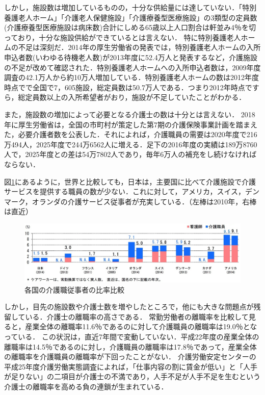 しかし，施設数は増加しているものの，十分な供給量には達していない．「特別養護老人ホーム」「介護老人保健施設」「介護療養型医療施設」の3類型の定員数(介護療養型医療施設は病床数)合計にしめる65歳以上人口割合は軒並み4％を切っており，十分な施設供給ができているとは言えない\cite{lack_facility_1}．
特に特別養護老人ホームの不足は深刻だ．2014年の厚生労働省の発表では，特別養護老人ホームの入所申込者数(いわゆる待機老人数)が2013年度に52.4万人と発表するなど，介護施設の不足が改めて確認された．特別養護老人ホームへの入所申込者数は，2009年度調査の42.1万人から約10万人増加している．特別養護老人ホームの数は2012年度時点でで全国で7，605施設，総定員数は50.7万人である．つまり2012年時点ですら，総定員数以上の入所希望者がおり，施設が不足していたことがわかる\cite{lack_facility_2}．

また，施設数の増加によって必要となる介護士の数は十分とは言えない．
2018年に厚生労働省は，全国の市町村が策定した第7期の介護保険事業計画を踏まえた，必要介護者数を公表した．それによれば，介護職員の需要は2020年度で216万494人，2025年度で244万6562人に増える．足下の2016年度の実績は189万8760人で，2025年度との差は54万7802人であり，毎年6万人の補充をし続けなければならない．

図\ref{care_worker_comparison}にあるように，世界と比較しても，日本は，主要国に比べて介護施設で介護サービスを提供する職員の数が少ない．これに対して，アメリカ，スイス，デンマーク，オランダの介護サービス従事者が充実している．（左棒は2010年，右棒は直近）\cite{care_worker_comparison}

\begin{figure}[htb]
 \begin{center}
 \includegraphics[scale=0.3]{figures/care_worker_comparison.png}
 \caption[各国の介護職従事者の比率比較]{各国の介護職従事者の比率比較 \label{care_worker_comparison}}
 \end{center}
\end{figure}

しかし，目先の施設数や介護士数を増やしたところで，他にも大きな問題点が残留している．介護士の離職率の高さである．
常勤労働者の離職率を比較して見ると，産業全体の離職率11.6％であるのに対して介護職員の離職率は19.0％となっている．
この状況は，直近7年間で変動していない．平成22年度の産業全体の離職率は14.5％であるのに対し，介護職員の離職率は17.8％であって，産業全体の離職率を介護職員の離職率が下回ったことがない\cite{turnover_rate}．
介護労働安定センターの平成25年度介護労働実態調査によれば，「仕事内容の割に賃金が低い」と「人手が足りない」の二項目が介護士の不満であり，人手不足が人手不足を生むという介護士の離職率を高める負の連鎖が生まれている．

